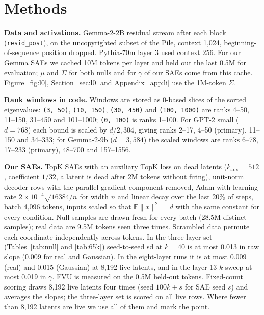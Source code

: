\documentclass{article}
\newcommand{\Sig}{\Sigma}
\begin{document}
\section{Methods}
\label{app:methods}

\textbf{Data and activations.} Gemma-2-2B residual stream after each block (\texttt{resid\_post}), on the uncopyrighted subset of the Pile, context 1,024, beginning-of-sequence position dropped. Pythia-70m layer 3 used context 256. For our Gemma SAEs we cached 10M tokens per layer and held out the last 0.5M for evaluation; $\mu$ and $\Sig$ for both nulls and for $\gamma$ of our SAEs come from this cache. Figure~\ref{fig:l0}, Section~\ref{sec:l0} and Appendix~\ref{app:li} use the 1M-token $\Sig$.

\textbf{Rank windows in code.} Windows are stored as 0-based slices of the sorted eigenvalues: \texttt{(3, 50)}, \texttt{(10, 150)}, \texttt{(30, 450)} and \texttt{(100, 1000)} are ranks 4--50, 11--150, 31--450 and 101--1000; \texttt{(0, 100)} is ranks 1--100. For GPT-2 small ($d=768$) each bound is scaled by $d/2{,}304$, giving ranks 2--17, 4--50 (primary), 11--150 and 34--333; for Gemma-2-9b ($d=3{,}584$) the scaled windows are ranks 6--78, 17--233 (primary), 48--700 and 157--1556.

\textbf{Our SAEs.} TopK SAEs with an auxiliary TopK loss on dead latents ($k_{\mathrm{aux}}=512$, coefficient $1/32$, a latent is dead after 2M tokens without firing), unit-norm decoder rows with the parallel gradient component removed, Adam with learning rate $2\times10^{-4}\sqrt{16384/n}$ for width $n$ and linear decay over the last 20\% of steps, batch 4,096 tokens, inputs scaled so that $\mathbb{E}\|x\|^2=d$ with the same constant for every condition. Null samples are drawn fresh for every batch (28.5M distinct samples); real data are 9.5M tokens seen three times. Scrambled data permute each coordinate independently across tokens. In the three-layer set (Tables~\ref{tab:null} and \ref{tab:65k}) seed-to-seed sd at $k=40$ is at most 0.013 in raw slope (0.009 for real and Gaussian). In the eight-layer runs it is at most 0.009 (real) and 0.015 (Gaussian) at 8,192 live latents, and in the layer-13 $k$ sweep at most 0.019 in $\gamma$. FVU is measured on the 0.5M held-out tokens. Fixed-count scoring draws 8,192 live latents four times (seed $100k+s$ for SAE seed $s$) and averages the slopes; the three-layer set is scored on all live rows. Where fewer than 8,192 latents are live we use all of them and mark the point.
\end{document}

